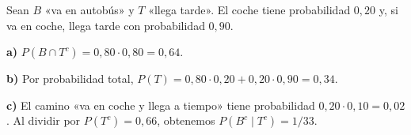 Sean $B$ «va en autobús» y $T$ «llega tarde». El coche tiene probabilidad $0{,}20$ y, si va en coche, llega tarde con probabilidad $0{,}90$.

\textbf{a)} $P(B\cap T^c)=0{,}80\cdot0{,}80=\boxed{0{,}64}$.

\textbf{b)} Por probabilidad total, $P(T)=0{,}80\cdot0{,}20+0{,}20\cdot0{,}90=\boxed{0{,}34}$.

\textbf{c)} El camino «va en coche y llega a tiempo» tiene probabilidad $0{,}20\cdot0{,}10=0{,}02$. Al dividir por $P(T^c)=0{,}66$, obtenemos $\boxed{P(B^c\mid T^c)=1/33}$.
